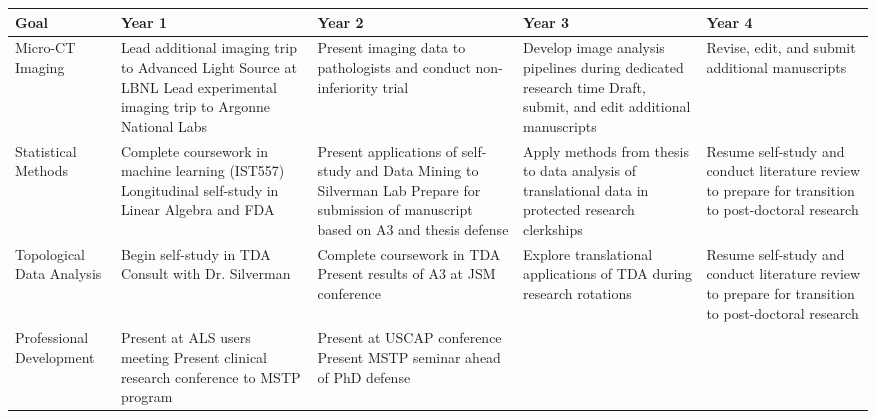 \begin{table}[h]
\centering
\begin{tabularx}{\textwidth}{|l|X|X|X|X|}
    \hline
    \textbf{Goal} & \textbf{Year 1} & \textbf{Year 2} & \textbf{Year 3} & \textbf{Year 4} \\
    \hline
    Micro-CT Imaging &
    Lead additional imaging trip to Advanced Light Source at LBNL \newline
    Lead experimental imaging trip to Argonne National Labs &
    Present imaging data to pathologists and conduct non-inferiority trial &
    Develop image analysis pipelines during dedicated research time \newline
    Draft, submit, and edit additional manuscripts &
    Revise, edit, and submit additional manuscripts \\
    \hline
    Statistical Methods &
    Complete coursework in machine learning (IST557) \newline
    Longitudinal self-study in Linear Algebra and FDA &
    Present applications of self-study and Data Mining to Silverman Lab \newline
    Prepare for submission of manuscript based on A3 and thesis defense &
                                                                          Apply methods from thesis to data analysis of translational data in protected research clerkships &
                                                                                                                                                                              Resume self-study and conduct literature review to prepare for transition to post-doctoral research \\
    \hline
    Topological Data Analysis &
    Begin self-study in TDA \newline
    Consult with Dr. Silverman &
    Complete coursework in TDA \newline
    Present results of A3 at JSM conference &
                                              Explore translational applications of TDA during research rotations &
                                                                                                                  Resume self-study and conduct literature review to prepare for transition to post-doctoral research \\
\hline
    Professional Development &
    Present at ALS users meeting
    Present clinical research conference to MSTP program &
    Present at USCAP conference \newline
    Present MSTP seminar ahead of PhD defense&

\end{tabularx}
\end{table}
